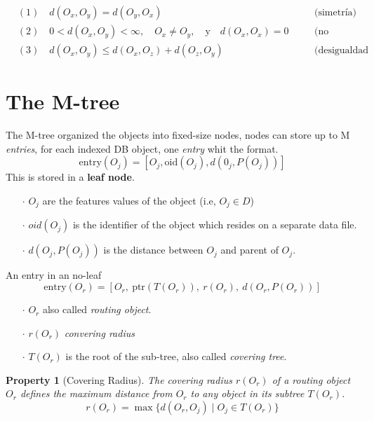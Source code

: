 \documentclass{article}
\newtheorem{property}{Property}
\begin{document}
			\begin{equation}
				\begin{aligned}
					 & (1) \quad d(O_x, O_y) = d(O_y, O_x)                                                          &  & \quad \text{(simetría)}               \\
					 & (2) \quad 0 < d(O_x, O_y) < \infty, \quad O_x \neq O_y, \quad \text{y} \quad d(O_x, O_x) = 0 &  & \quad \text{(no negatividad)}         \\
					 & (3) \quad d(O_x, O_y) \leq d(O_x, O_z) + d(O_z, O_y)                                         &  & \quad \text{(desigualdad triangular)}
				\end{aligned}
			\end{equation}

		
	\section{The M-tree}
	The M-tree organized the objects into fixed-size nodes, nodes can store up to M \textit{entries}, for each indexed DB object, one \textit{entry} whit the format.
	$$
		\text{entry}(O_{j}) = [O_{j}, \text{oid}(O_{j}), d(0_{j}, P(O_{j}))]
	$$
	This is stored in a \textbf{leaf node}.
	\begin{itemize}
		\item[$\cdot$] $O_{j}$ are the features values of the object (i.e, $O_{j} \in D$)
		\item[$\cdot$] $oid(O_{j})$ is the identifier of the object which resides on a separate data file. 
		\item[$\cdot$] $d(O_{j}, P(O_{j}))$ is the distance between $O_{j}$ and parent of $O_{j}$.
		
	\end{itemize}
	
	An entry in an no-leaf
	$$
	\text{entry}(O_{r}) = [O_{r},\ \text{ptr}(T(O_{r})),\ r(O_{r}),\ d(O_{r}, P(O_{r}))]
	$$

	\begin{itemize}
		\item[$\cdot$] $O_{r}$ also called \textit{routing object}.
		\item[$\cdot$] $r(O_{r})$ \textit{convering radius} 
		\item[$\cdot$] $T(O_{r})$ is the root of the sub-tree, also called \textit{covering tree}.
	\end{itemize}

	
	\begin{property}[Covering Radius]
		The covering radius \( r(O_r) \) of a routing object \( O_r \) defines the maximum distance from \( O_r \) to any object in its subtree \( T(O_r) \).
		\[
		r(O_r) = \max \big\lbrace d(O_r, O_j) \mid O_j \in T(O_r) \big\rbrace
		\]
	\end{property}
	
\end{document}
